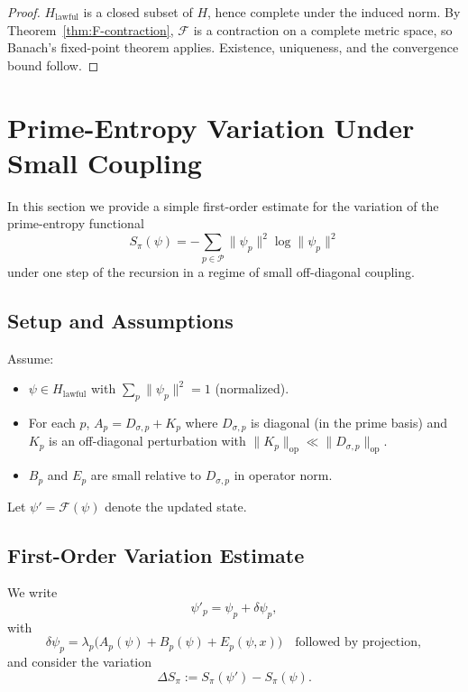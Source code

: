 \documentclass[11pt]{article}
\begin{document}
\begin{proof}
$H_{\text{lawful}}$ is a closed subset of $H$, hence complete under the induced norm.
By Theorem~\ref{thm:F-contraction}, $\mathcal{F}$ is a contraction on a complete metric space, so Banach's fixed-point theorem applies.
Existence, uniqueness, and the convergence bound follow.
\end{proof}

\section{Prime-Entropy Variation Under Small Coupling}

In this section we provide a simple first-order estimate for the variation of the prime-entropy functional
\[
  S_\pi(\psi) = - \sum_{p \in \mathcal{P}} \|\psi_p\|^2 \log \|\psi_p\|^2
\]
under one step of the recursion in a regime of small off-diagonal coupling.

\subsection{Setup and Assumptions}

Assume:
\begin{itemize}[leftmargin=1.5em]
  \item $\psi \in H_{\text{lawful}}$ with $\sum_p \|\psi_p\|^2 = 1$ (normalized).
  \item For each $p$, $A_p = D_{\sigma,p} + K_p$ where $D_{\sigma,p}$ is diagonal (in the prime basis) and $K_p$ is an off-diagonal perturbation with $\|K_p\|_{\mathrm{op}} \ll \|D_{\sigma,p}\|_{\mathrm{op}}$.
  \item $B_p$ and $E_p$ are small relative to $D_{\sigma,p}$ in operator norm.
\end{itemize}

Let $\psi' = \mathcal{F}(\psi)$ denote the updated state.

\subsection{First-Order Variation Estimate}

We write
\[
  \psi'_p = \psi_p + \delta \psi_p,
\]
with
\[
  \delta \psi_p = \lambda_p\bigl( A_p(\psi) + B_p(\psi) + E_p(\psi,x) \bigr)
  \quad\text{followed by projection},
\]
and consider the variation
\[
  \Delta S_\pi := S_\pi(\psi') - S_\pi(\psi).
\]
\end{document}
